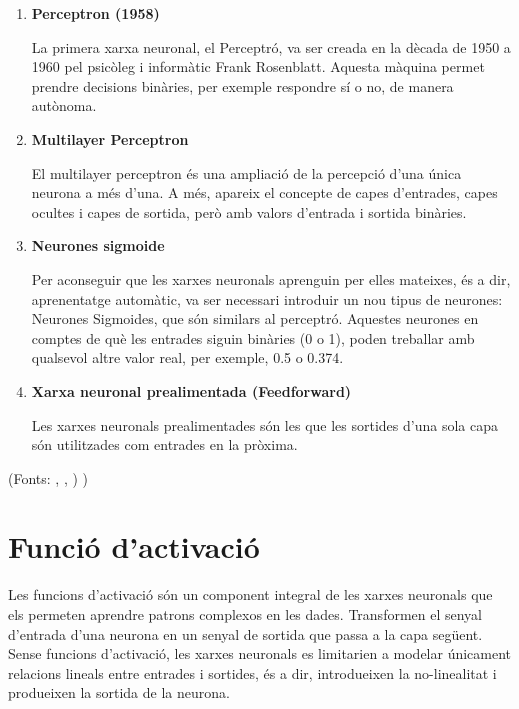 \begin{enumerate}
    \item \textbf{Perceptron (1958)}

    La primera xarxa neuronal, el Perceptró, va ser creada en la dècada de 1950 a 1960 pel psicòleg i informàtic Frank Rosenblatt. Aquesta màquina permet prendre decisions binàries, per exemple respondre sí o no, de manera autònoma.

    \item \textbf{Multilayer Perceptron}

    El multilayer perceptron és una ampliació de la percepció d'una única neurona a més d'una. A més, apareix el concepte de capes d'entrades, capes ocultes i capes de sortida, però amb valors d'entrada i sortida binàries.

    \item \textbf{Neurones sigmoide}

    Per aconseguir que les xarxes neuronals aprenguin per elles mateixes, és a dir, aprenentatge automàtic, va ser necessari introduir un nou tipus de neurones: Neurones Sigmoides, que són similars al perceptró. Aquestes neurones en comptes de què les entrades siguin binàries (0 o 1), poden treballar amb qualsevol altre valor real, per exemple, 0.5 o 0.374.

    \item \textbf{Xarxa neuronal prealimentada (Feedforward)}

    Les xarxes neuronals prealimentades són les que les sortides d'una sola capa són utilitzades com entrades en la pròxima.
\end{enumerate}
(Fonts: \cite{TreballFinalDeGrau}, \cite{Medium}, \cite{MediumSigmoid}) \cite{FeedForward})
\section{Funció d'activació}\label{Activació}

Les funcions d'activació són un component integral de les xarxes neuronals que els permeten aprendre patrons complexos en les dades. Transformen el senyal d'entrada d'una neurona en un senyal de sortida que passa a la capa següent. Sense funcions d'activació, les xarxes neuronals es limitarien a modelar únicament relacions lineals entre entrades i sortides, és a dir, introdueixen la no-linealitat i produeixen la sortida de la neurona.

